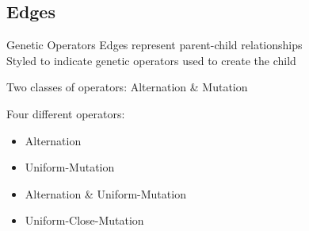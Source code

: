 \documentclass{beamer}
\begin{document}
\subsection[Edges]{Edges}

\begin{frame}{Genetic Operators}
Edges represent parent-child relationships
\\
\vspace{.75em}
Styled to indicate genetic operators used to create the child
\\
\vspace{.75em}

Two classes of operators: Alternation \& Mutation
\\
\vspace{.75em}

Four different operators:
\begin{itemize}
\item Alternation %
\item Uniform-Mutation %
\item Alternation \& Uniform-Mutation
\item Uniform-Close-Mutation %
\end{itemize} 
\end{frame}
\end{document}
